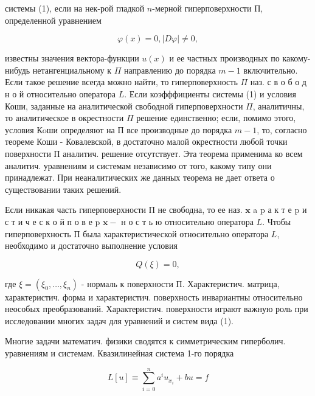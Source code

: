 \documentclass[10pt]{article}
\begin{document}
системы (1), если на нек-рой гладкой $n$-мерной гиперповерхности П, определенной уравнением



\[

\varphi(x)=0,|D \varphi| \neq 0,

\]



известны значения вектора-функции $u(x)$ и ее частных производных по какому-нибудь нетангенциальному к $\Pi$ направлению до порядка $m-1$ включительно. Если такое решение всегда можно найти, то гиперповерхность $\Pi$ наз. с в о б о д н о й относительно оператора $L$. Если коэфффициенты системы (1) и условия Коши, заданные на аналитической свободной гиперповерхности $\Pi$, аналитичны, то аналитическое в окрестности $\Pi$ решение единственно; если, помимо этого, условия Кoши определяют на П все производные до порядка $m-1$, то, согласно теореме Коши - Ковалевской, в достаточно малой окрестности любой точки поверхности П аналитич. решение отсутствует. Эта теорема применима ко всем аналитич. уравнениям и системам независимо от того, какому типу они принадлежат. При неаналитических же данных теорема не дает ответа о существовании таких решений.



Если никакая часть гиперповерхности П не свободна, то ее наз. $\mathbf{x}$ a $\mathrm{p}$ а к т е $\mathrm{p}$ и с т и ч е с к о й п о в е p $\mathbf{x}-$ н о с т ь ю относительно оператора $L$. Чтобы гиперповерхность П была характеристической относительно оператора $L$, необходимо и достаточно выполнение условия



\[

Q(\xi)=0,

\]



где $\xi=\left(\xi_{0}, \ldots, \xi_{n}\right)$ - нормаль к поверхности П. Характеристич. матрица, характеристич. форма и характеристич. поверхность инвариантны относительно неособых преобразований. Характеристич. поверхности играют важную роль при исследовании многих задач для уравнений и систем вида (1).



Многие задачи математич. физики сводятся к симметрическим гиперболич. уравнениям и системам. Квазилинейная система 1-го порядка



\[

L[u] \equiv \sum_{i=0}^{n} a^{i} u_{x_{i}}+b u=f

\]
\end{document}

